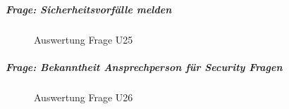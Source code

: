 \documentclass[../../main.tex]{subfiles}
\begin{document}
\subparagraph*{Frage: Sicherheitsvorfälle melden}\mbox{}
\begin{figure}[H]
\centering
{}
\caption{Auswertung Frage U25}
\label{U25}
\end{figure}

\subparagraph*{Frage: Bekanntheit Ansprechperson für Security Fragen}\mbox{}
\begin{figure}[H]
\centering
{}
\caption{Auswertung Frage U26}
\label{U26}
\end{figure}
\end{document}
